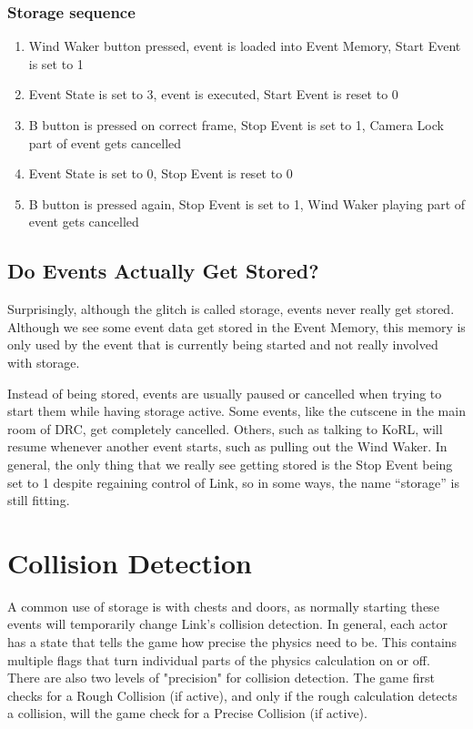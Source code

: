 \documentclass[titlepage,12pt,a4paper]{article}
\let\stdsection\section
\renewcommand\section{\newpage\stdsection}
\begin{document}
\subsubsection{Storage sequence}
\begin{enumerate}
	\item Wind Waker button pressed, event is loaded into Event Memory, Start Event is set to 1
	\item Event State is set to 3, event is executed, Start Event is reset to 0
	\item B button is pressed on correct frame, Stop Event is set to 1, Camera Lock part of event gets cancelled
	\item Event State is set to 0, Stop Event is reset to 0
	\item B button is pressed again, Stop Event is set to 1, Wind Waker playing part of event gets cancelled
\end{enumerate}

\subsection{Do Events Actually Get Stored?}
Surprisingly, although the glitch is called storage, events never really get stored. Although we see some event data get stored in the Event Memory, this memory is only used by the event that is currently being started and not really involved with storage.

Instead of being stored, events are usually paused or cancelled when trying to start them while having storage active. Some events, like the cutscene in the main room of DRC, get completely cancelled. Others, such as talking to KoRL, will resume whenever another event starts, such as pulling out the Wind Waker. In general, the only thing that we really see getting stored is the Stop Event being set to 1 despite regaining control of Link, so in some ways, the name “storage” is still fitting.

\section{Collision Detection}
A common use of storage is with chests and doors, as normally starting these events will temporarily change Link’s collision detection. In general, each actor has a state that tells the game how precise the physics need to be. This contains multiple flags that turn individual parts of the physics calculation on or off. There are also two levels of "precision" for collision detection. The game first checks for a Rough Collision (if active), and only if the rough calculation detects a collision, will the game check for a Precise Collision (if active). 
\end{document}

